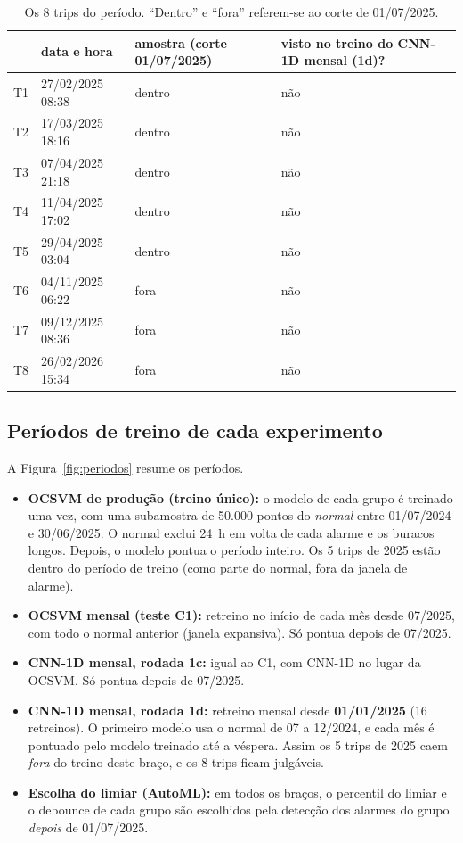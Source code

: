 \documentclass[11pt,a4paper]{article}
\begin{document}
\begin{table}[H]
\centering\small
\caption{Os 8 trips do período. ``Dentro'' e ``fora'' referem-se ao corte de 01/07/2025.}
\label{tab:trips}
\begin{tabular}{llll}
\toprule
& data e hora & amostra (corte 01/07/2025) & visto no treino do CNN-1D mensal (1d)? \\
\midrule
T1 & 27/02/2025 08:38 & dentro & não \\
T2 & 17/03/2025 18:16 & dentro & não \\
T3 & 07/04/2025 21:18 & dentro & não \\
T4 & 11/04/2025 17:02 & dentro & não \\
T5 & 29/04/2025 03:04 & dentro & não \\
T6 & 04/11/2025 06:22 & fora & não \\
T7 & 09/12/2025 08:36 & fora & não \\
T8 & 26/02/2026 15:34 & fora & não \\
\bottomrule
\end{tabular}
\end{table}

\subsection{Períodos de treino de cada experimento}

A Figura~\ref{fig:periodos} resume os períodos.

\begin{itemize}
  \item \textbf{OCSVM de produção (treino único):} o modelo de cada grupo é treinado uma vez, com uma subamostra de
        50.000 pontos do \emph{normal} entre 01/07/2024 e 30/06/2025. O normal exclui 24~h em volta de cada alarme e
        os buracos longos. Depois, o modelo pontua o período inteiro. Os 5 trips de 2025 estão dentro do período de
        treino (como parte do normal, fora da janela de alarme).
  \item \textbf{OCSVM mensal (teste C1):} retreino no início de cada mês desde 07/2025, com todo o normal anterior
        (janela expansiva). Só pontua depois de 07/2025.
  \item \textbf{CNN-1D mensal, rodada 1c:} igual ao C1, com CNN-1D no lugar da OCSVM. Só pontua depois de 07/2025.
  \item \textbf{CNN-1D mensal, rodada 1d:} retreino mensal desde \textbf{01/01/2025} (16 retreinos). O primeiro modelo
        usa o normal de 07 a 12/2024, e cada mês é pontuado pelo modelo treinado até a véspera. Assim os 5 trips de
        2025 caem \emph{fora} do treino deste braço, e os 8 trips ficam julgáveis.
  \item \textbf{Escolha do limiar (AutoML):} em todos os braços, o percentil do limiar e o debounce de cada grupo são
        escolhidos pela detecção dos alarmes do grupo \emph{depois} de 01/07/2025.
\end{itemize}
\end{document}
